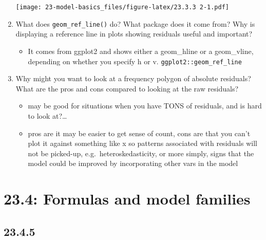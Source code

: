 \documentclass[]{book}
\providecommand{\tightlist}{%
  \setlength{\itemsep}{0pt}\setlength{\parskip}{0pt}}
\theoremstyle{definition}
\theoremstyle{definition}
\theoremstyle{definition}
\theoremstyle{remark}
\begin{document}
\begin{enumerate}
  \texttt{[image: 23-model-basics\_files/figure-latex/23.3.3 2-1.pdf]}
\item
  What does \texttt{geom\_ref\_line()} do? What package does it come
  from? Why is displaying a reference line in plots showing residuals
  useful and important?

  \begin{itemize}
  \tightlist
  \item
    It comes from ggplot2 and shows either a geom\_hline or a
    geom\_vline, depending on whether you specify h or v.
    \texttt{ggplot2::geom\_ref\_line}
  \end{itemize}
\item
  Why might you want to look at a frequency polygon of absolute
  residuals? What are the pros and cons compared to looking at the raw
  residuals?

  \begin{itemize}
  \tightlist
  \item
    may be good for situations when you have TONS of residuals, and is
    hard to look at?\ldots{}
  \item
    pros are it may be easier to get sense of count, cons are that you
    can't plot it against something like x so patterns associated with
    residuals will not be picked-up, e.g.~heteroskedasticity, or more
    simply, signs that the model could be improved by incorporating
    other vars in the model
  \end{itemize}
\end{enumerate}

\hypertarget{formulas-and-model-families}{%
\section{23.4: Formulas and model
families}\label{formulas-and-model-families}}

\hypertarget{section-80}{%
\subsection{23.4.5}\label{section-80}}
\end{document}
